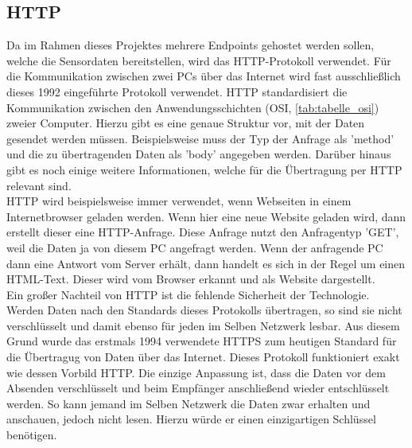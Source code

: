 \subsection{HTTP}
Da im Rahmen dieses Projektes mehrere Endpoints gehostet werden sollen, welche die Sensordaten bereitstellen, wird das \ac{HTTP}-Protokoll verwendet. Für die Kommunikation zwischen zwei PCs über das Internet wird fast ausschließlich dieses 1992 eingeführte Protokoll verwendet. \ac{HTTP}  standardisiert die Kommunikation zwischen den Anwendungsschichten (\ac{OSI}, \autoref{tab:tabelle_osi}) zweier Computer. Hierzu gibt es eine genaue Struktur vor, mit der Daten gesendet werden müssen. Beispielsweise muss der Typ der Anfrage als 'method' und die zu übertragenden Daten als 'body' angegeben werden. Darüber hinaus gibt es noch einige weitere Informationen, welche für die Übertragung per HTTP relevant sind.\\
\ac{HTTP} wird beispielsweise immer verwendet, wenn Webseiten in einem Internetbrowser geladen werden. Wenn hier eine neue Website geladen wird, dann erstellt dieser eine HTTP-Anfrage. Diese Anfrage nutzt den Anfragentyp 'GET', weil die Daten ja von diesem PC angefragt werden. Wenn der anfragende PC dann eine Antwort vom Server erhält, dann handelt es sich in der Regel um einen \ac{HTML}-Text. Dieser wird vom Browser erkannt und als Website dargestellt.\\
Ein großer Nachteil von \ac{HTTP} ist die fehlende Sicherheit der Technologie. Werden Daten nach den Standards dieses Protokolls übertragen, so sind sie nicht verschlüsselt und damit ebenso für jeden im Selben Netzwerk lesbar. Aus diesem Grund wurde das erstmals 1994 verwendete \ac{HTTPS} zum heutigen Standard für die Übertragug von Daten über das Internet. Dieses Protokoll funktioniert exakt wie dessen Vorbild \ac{HTTP}. Die einzige Anpassung ist, dass die Daten vor dem Absenden verschlüsselt und beim Empfänger anschließend wieder entschlüsselt werden. So kann jemand im Selben Netzwerk die Daten zwar erhalten und anschauen, jedoch nicht lesen. Hierzu würde er einen einzigartigen Schlüssel benötigen.\\

